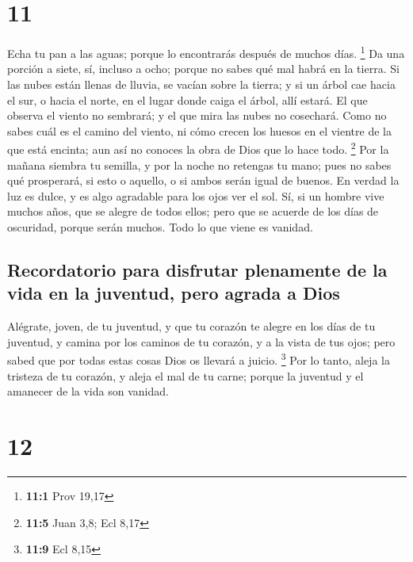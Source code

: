 \hypertarget{section-10}{%
\section{11}\label{section-10}}

 Echa tu pan a las aguas; porque lo encontrarás después de
muchos días. \footnote{\textbf{11:1} Prov 19,17}  Da una
porción a siete, sí, incluso a ocho; porque no sabes qué mal habrá en la
tierra.  Si las nubes están llenas de lluvia, se vacían
sobre la tierra; y si un árbol cae hacia el sur, o hacia el norte, en el
lugar donde caiga el árbol, allí estará.  El que observa
el viento no sembrará; y el que mira las nubes no cosechará.
 Como no sabes cuál es el camino del viento, ni cómo
crecen los huesos en el vientre de la que está encinta; aun así no
conoces la obra de Dios que lo hace todo. \footnote{\textbf{11:5} Juan
  3,8; Ecl 8,17}  Por la mañana siembra tu semilla, y por
la noche no retengas tu mano; pues no sabes qué prosperará, si esto o
aquello, o si ambos serán igual de buenos.  En verdad la
luz es dulce, y es algo agradable para los ojos ver el sol.
 Sí, si un hombre vive muchos años, que se alegre de todos
ellos; pero que se acuerde de los días de oscuridad, porque serán
muchos. Todo lo que viene es vanidad.

\hypertarget{recordatorio-para-disfrutar-plenamente-de-la-vida-en-la-juventud-pero-agrada-a-dios}{%
\subsection{Recordatorio para disfrutar plenamente de la vida en la
juventud, pero agrada a
Dios}\label{recordatorio-para-disfrutar-plenamente-de-la-vida-en-la-juventud-pero-agrada-a-dios}}

 Alégrate, joven, de tu juventud, y que tu corazón te
alegre en los días de tu juventud, y camina por los caminos de tu
corazón, y a la vista de tus ojos; pero sabed que por todas estas cosas
Dios os llevará a juicio. \footnote{\textbf{11:9} Ecl 8,15}
 Por lo tanto, aleja la tristeza de tu corazón, y aleja
el mal de tu carne; porque la juventud y el amanecer de la vida son
vanidad.

\hypertarget{section-11}{%
\section{12}\label{section-11}}

